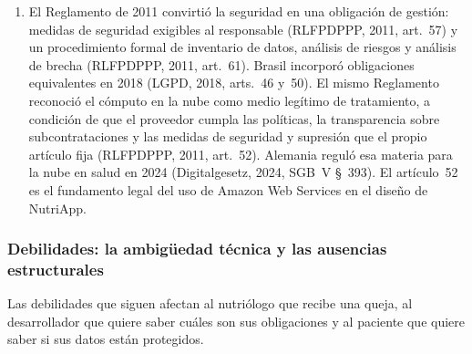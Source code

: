 \documentclass[12pt, a4paper]{article}
\begin{document}
\begin{enumerate}[label=\Roman*.]
  \item El Reglamento de 2011 convirtió la seguridad en una obligación de
  gestión: medidas de seguridad exigibles al responsable (RLFPDPPP, 2011,
  art.~57) y un procedimiento formal de inventario de datos, análisis de
  riesgos y análisis de brecha (RLFPDPPP, 2011, art.~61). Brasil incorporó
  obligaciones equivalentes en 2018 (LGPD, 2018, arts.~46 y~50). El mismo
  Reglamento reconoció el cómputo en la nube como medio legítimo de
  tratamiento, a condición de que el proveedor cumpla las
  políticas, la transparencia sobre subcontrataciones y las medidas
  de seguridad y supresión que el propio artículo fija (RLFPDPPP,
  2011, art.~52). Alemania reguló esa materia para la nube en salud
  en 2024 (Digitalgesetz, 2024, SGB~V \S~393). El artículo~52 es el
  fundamento legal del uso de Amazon Web Services en el diseño de
  NutriApp.
 
\end{enumerate}
 
 
\subsubsection{Debilidades: la ambigüedad técnica y las ausencias
estructurales}
 
Las debilidades que siguen afectan al nutriólogo que recibe una
queja, al desarrollador que quiere saber cuáles son sus
obligaciones y al paciente que quiere saber si sus datos están
protegidos.
 
\end{document}
